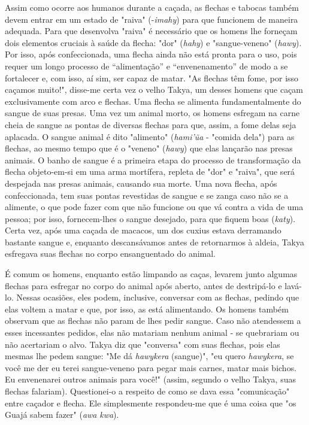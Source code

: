 Assim como ocorre aos humanos durante a caçada, as flechas e tabocas
também devem entrar em um estado de "raiva" (-\emph{imahy}) para que
funcionem de maneira adequada. Para que desenvolva "raiva" é necessário
que os homens lhe forneçam dois elementos cruciais à saúde da flecha:
"dor" (\emph{hahy}) e "sangue-veneno" (\emph{hawy}). Por isso, após
confeccionada, uma flecha ainda não está pronta para o uso, pois requer
um longo processo de ``alimentação'' e ``envenenamento'' de modo a se
fortalecer e, com isso, aí sim, ser capaz de matar. "As flechas têm
fome, por isso caçamos muito!", disse-me certa vez o velho Takya, um
desses homens que caçam exclusivamente com arco e flechas. Uma flecha se
alimenta fundamentalmente do sangue de suas presas. Uma vez um animal
morto, os homens esfregam na carne cheia de sangue as pontas de diversas
flechas para que, assim, a fome delas seja aplacada. O sangue animal é
dito "alimento" (\emph{hami'ũa} - "comida dela") para as flechas, ao
mesmo tempo que é o "veneno" (\emph{hawy}) que elas lançarão nas presas
animais. O banho de sangue é a primeira etapa do processo de
transformação da flecha objeto-em-si em uma arma mortífera, repleta de
"dor" e "raiva", que será despejada nas presas animais, causando sua
morte. Uma nova flecha, após confeccionada, tem suas pontas revestidas
de sangue e se zanga caso não se a alimente, o que pode fazer com que
não funcione ou que vá contra a vida de uma pessoa; por isso,
fornecem-lhes o sangue desejado, para que fiquem boas (\emph{katy}).
Certa vez, após uma caçada de macacos, um dos cuxius estava derramando
bastante sangue e, enquanto descansávamos antes de retornarmos à aldeia,
Takya esfregava suas flechas no corpo ensanguentado do animal.

É comum os homens, enquanto estão limpando as caças, levarem junto
algumas flechas para esfregar no corpo do animal após aberto, antes de
destripá-lo e lavá-lo. Nessas ocasiões, eles podem, inclusive, conversar
com as flechas, pedindo que elas voltem a matar e que, por isso, as está
alimentando. Os homens também observam que as flechas não param de lhes
pedir sangue. Caso não atendessem a esses incessantes pedidos, elas não
matariam nenhum animal - se quebrariam ou não acertariam o alvo. Takya
diz que "conversa" com suas flechas, pois elas mesmas lhe pedem sangue:
"Me dá \emph{hawykera} (sangue)", "eu quero \emph{hawykera}, se você me
der eu terei sangue-veneno para pegar mais carnes, matar mais bichos. Eu
envenenarei outros animais para você!" (assim, segundo o velho Takya,
suas flechas falariam). Questionei-o a respeito de como se dava essa
"comunicação" entre caçador e flecha. Ele simplesmente respondeu-me que
é uma coisa que "os Guajá sabem fazer" (\emph{awa} \emph{kwa}).

